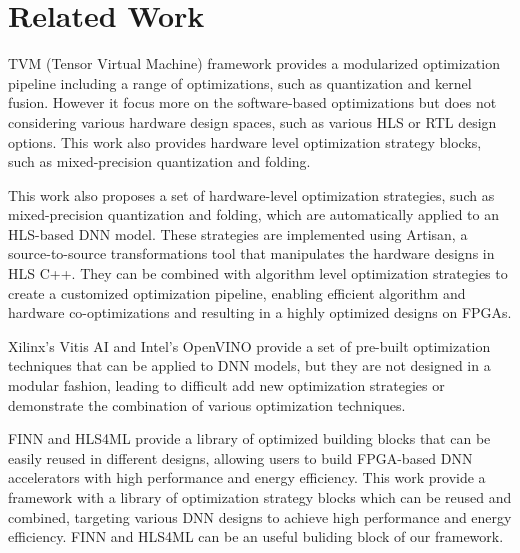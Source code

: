 

\newpage

\section{Related Work}\label{sec:related_work}

TVM (Tensor Virtual Machine) framework provides a modularized optimization pipeline including a range of optimizations, such as quantization and kernel fusion. However it focus more on the software-based optimizations but does not considering various hardware design spaces, such as various HLS or RTL design options. This work also provides hardware level optimization strategy blocks, such as mixed-precision quantization and folding. 

This work also proposes a set of hardware-level optimization strategies, such as mixed-precision quantization and folding, which are automatically applied to an HLS-based DNN model. These strategies are implemented using Artisan, a source-to-source transformations tool that manipulates the hardware designs in HLS C++. They can be combined with algorithm level optimization strategies to create a customized optimization pipeline, enabling efficient algorithm and hardware co-optimizations and resulting in a highly optimized designs on FPGAs. 



Xilinx's Vitis AI and Intel's OpenVINO provide a set of pre-built optimization techniques that can be applied to DNN models, but they are not designed in a modular fashion, leading to difficult add new optimization strategies or demonstrate the combination of various optimization techniques. 

FINN and HLS4ML provide a library of optimized building blocks that can be easily reused in different designs, allowing users to build FPGA-based DNN accelerators with high performance and energy efficiency. This work provide a framework with a library of optimization strategy blocks which can be reused and combined, targeting various DNN designs to achieve high performance and energy efficiency. FINN and HLS4ML can be an useful buliding block of our framework. 



